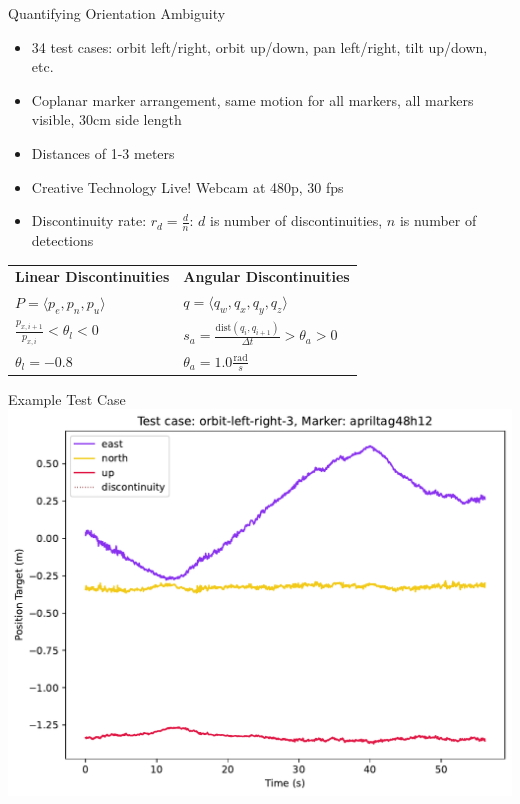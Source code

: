 \documentclass[aspectratio=169]{beamer}
\newif\ifpause
\newcommand{\mypause}{\ifpause \pause \fi}
\begin{document}
\begin{frame}{Quantifying Orientation Ambiguity}
	\centering
	\begin{itemize}
		\item 34 test cases: orbit left/right, orbit up/down, pan left/right, tilt up/down, etc.\mypause
		\item Coplanar marker arrangement, same motion for all markers, all markers visible, 30cm side length\mypause
		\item Distances of 1-3 meters\mypause
		\item Creative Technology Live! Webcam at 480p, 30 fps
		\item Discontinuity rate: $r_d = \frac{d}{n}$: $d$ is number of discontinuities, $n$ is number of detections
	\end{itemize}
	\begin{tabular}{ll}
		\textbf{Linear Discontinuities} & \textbf{Angular Discontinuities}\\
		$P = \langle p_e, p_n, p_u \rangle$ & $q = \langle q_w, q_x, q_y, q_z \rangle$\\
		$\frac{p_{x,i+1}}{p_{x,i}} < \theta_l < 0$ & $s_a = \frac{\mathrm{dist} \left( q_i, q_{i+1} \right) }{\Delta t} > \theta_a > 0$\\
		$\theta_l = -0.8$ & $\theta_a = 1.0 \frac{\mathrm{rad}}{s}$
	\end{tabular}
\end{frame}


\begin{frame}{Example Test Case}
	\centering
	\includegraphics[width=0.75\linewidth]{images/orbit-left-right-3_apriltag48h12_position-target}
\end{frame}
\end{document}
